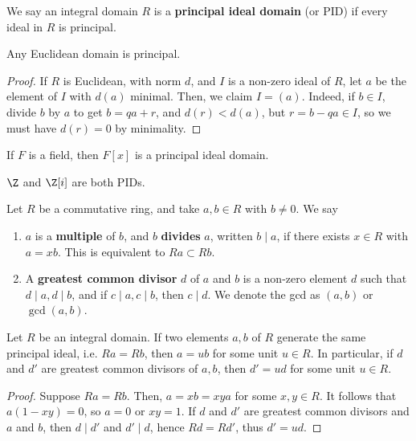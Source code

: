 \begin{defn}
    We say an integral domain $R$ is a \textbf{principal ideal domain} (or PID) if every ideal in $R$ is principal.
\end{defn}

\begin{prop}
    Any Euclidean domain is principal.
\end{prop}

\begin{proof}
    If $R$ is Euclidean, with norm $d$, and $I$ is a non-zero ideal of $R$, let $a$ be the element of $I$ with $d(a)$ minimal. Then, we claim $I = (a)$. Indeed, if $b \in I$, divide $b$ by $a$ to get $b=qa+r$, and $d(r) < d(a)$, but $r = b-qa \in I$, so we must have $d(r) = 0$ by minimality.
\end{proof}

\begin{cor}
    If $F$ is a field, then $F[x]$ is a principal ideal domain.
\end{cor}

\begin{ex}
    $\Z$ and $\Z[i]$ are both PIDs.
\end{ex}

\begin{defn}
    Let $R$ be a commutative ring, and take $a,b \in R$ with $b \neq 0$. We say
    \begin{enumerate}
        \item[(i)] $a$ is a \textbf{multiple} of $b$, and $b$ \textbf{divides} $a$, written $b \mid a$, if there exists $x \in R$ with $a=xb$. This is equivalent to $Ra \subset Rb$.
        \item[(ii)] A \textbf{greatest common divisor} $d$ of $a$ and $b$ is a non-zero element $d$ such that $d\mid a, d \mid b$, and if $c\mid a,c \mid b$, then $c \mid d$. We denote the gcd as $(a,b)$ or $\gcd (a,b)$.
    \end{enumerate}
\end{defn}

\begin{prop}
    Let $R$ be an integral domain. If two elements $a,b$ of $R$ generate the same principal ideal, i.e. $Ra=Rb$, then $a=ub$ for some unit $u \in R$. In particular, if $d$ and $d'$ are greatest common divisors of $a,b$, then $d'=ud$ for some unit $u\in R$.
\end{prop}

\begin{proof}
    Suppose $Ra=Rb$. Then, $a=xb=xya$ for some $x,y \in R$. It follows that $a(1-xy)=0$, so $a=0$ or $xy=1$. If $d$ and $d'$ are greatest common divisors and $a$ and $b$, then $d \mid d'$ and $d' \mid d$, hence $Rd=Rd'$, thus $d'=ud$.
\end{proof}

